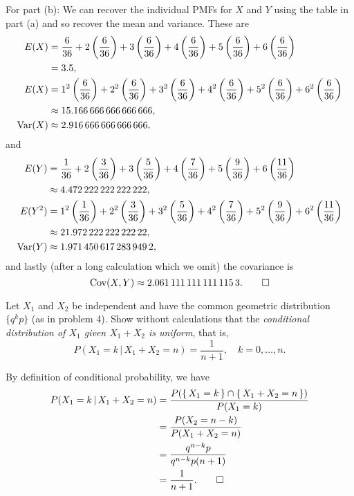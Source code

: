 \begin{solution}
  For part (b): We can recover the individual PMFs for \(X\) and \(Y\)
  using the table in part (a) and so recover the mean and variance. These
  are
  \begin{align*}
    E(X)&=\frac{6}{36}%
          +2\left(\frac{6}{36}\right)%
          +3\left(\frac{6}{36}\right)%
          +4\left(\frac{6}{36}\right)%
          +5\left(\frac{6}{36}\right)%
          +6\left(\frac{6}{36}\right)\\
        &=3.5,\\
    E(X)&=1^2\left(\frac{6}{36}\right)%
          +2^2\left(\frac{6}{36}\right)%
          +3^2\left(\frac{6}{36}\right)%
          +4^2\left(\frac{6}{36}\right)%
          +5^2\left(\frac{6}{36}\right)%
          +6^2\left(\frac{6}{36}\right)\\
        &\approx\num{15.166666666666666},\\
    \Var(X)&\approx\num{2.916666666666666},
  \end{align*}
  and
  \begin{align*}
    E(Y)&=\frac{1}{36}%
          +2\left(\frac{3}{36}\right)%
          +3\left(\frac{5}{36}\right)%
          +4\left(\frac{7}{36}\right)%
          +5\left(\frac{9}{36}\right)%
          +6\left(\frac{11}{36}\right)\\
        &\approx\num{4.472222222222222},\\
    E(Y^2)&=1^2\left(\frac{1}{36}\right)%
          +2^2\left(\frac{3}{36}\right)%
          +3^2\left(\frac{5}{36}\right)%
          +4^2\left(\frac{7}{36}\right)%
          +5^2\left(\frac{9}{36}\right)%
          +6^2\left(\frac{11}{36}\right)\\
        &\approx\num{21.97222222222222},\\
    \Var(Y)&\approx\num{1.9714506172839492},
  \end{align*}
  and lastly (after a long calculation which we omit) the covariance is
  \[
    \operatorname{Cov}(X,Y)\approx\num{2.0611111111111153}.\qedhere
  \]
\end{solution}

\begin{problem}[Handout 15, \# 19]
  Let \(X_1\) and \(X_2\) be independent and have the common geometric
  distribution \(\{q^kp\}\) (as in problem 4). Show without calculations
  that the \emph{conditional distribution of \(X_1\) given \(X_1+X_2\) is
    uniform}, that is,
  \begin{equation}
    \label{eq:12:uniform-conditional-pmf}
    P(X_1=k\,|\,X_1+X_2=n)=\frac{1}{n+1},\quad k=0,\dotsc,n.
  \end{equation}
\end{problem}
\begin{solution}
  By definition of conditional probability, we have
  \begin{align*}
    P(X_1=k\,|\,X_1+X_2=n)
    &=\frac{P(\{\,X_1=k\,\}\cap\{\,X_1+X_2=n\,\})}{P(X_1=k)}\\
    &=\frac{P(X_2=n-k)}{P(X_1+X_2=n)}\\
    &=\frac{q^{n-k}p}{q^{n-k}p(n+1)}\\
    &=\frac{1}{n+1}.\qedhere
  \end{align*}
\end{solution}

